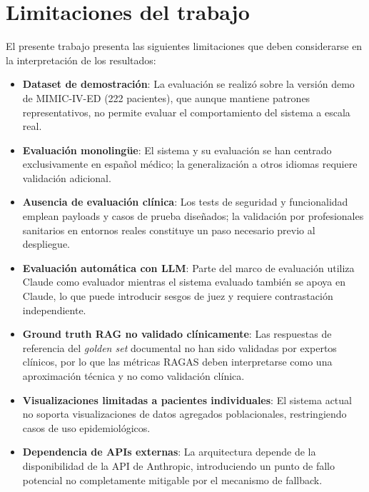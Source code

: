 \section{Limitaciones del trabajo}
\label{sec:limitaciones}

El presente trabajo presenta las siguientes limitaciones que deben considerarse en la interpretación de los resultados:

\begin{itemize}
    \item \textbf{Dataset de demostración}: La evaluación se realizó sobre la versión demo de \acs{MIMIC}-IV-\acs{ED} (222 pacientes), que aunque mantiene patrones representativos, no permite evaluar el comportamiento del sistema a escala real.
    
    \item \textbf{Evaluación monolingüe}: El sistema y su evaluación se han centrado exclusivamente en español médico; la generalización a otros idiomas requiere validación adicional.
    
    \item \textbf{Ausencia de evaluación clínica}: Los tests de seguridad y funcionalidad emplean payloads y casos de prueba diseñados; la validación por profesionales sanitarios en entornos reales constituye un paso necesario previo al despliegue.
    
    \item \textbf{Evaluación automática con \ac{LLM}}: Parte del marco de evaluación utiliza Claude como evaluador mientras el sistema evaluado también se apoya en Claude, lo que puede introducir sesgos de juez y requiere contrastación independiente.
    
    \item \textbf{Ground truth \ac{RAG} no validado clínicamente}: Las respuestas de referencia del \textit{golden set} documental no han sido validadas por expertos clínicos, por lo que las métricas \ac{RAGAS} deben interpretarse como una aproximación técnica y no como validación clínica.
    
    \item \textbf{Visualizaciones limitadas a pacientes individuales}: El sistema actual no soporta visualizaciones de datos agregados poblacionales, restringiendo casos de uso epidemiológicos.
    
    \item \textbf{Dependencia de APIs externas}: La arquitectura depende de la disponibilidad de la \ac{API} de Anthropic, introduciendo un punto de fallo potencial no completamente mitigable por el mecanismo de fallback.
\end{itemize}

